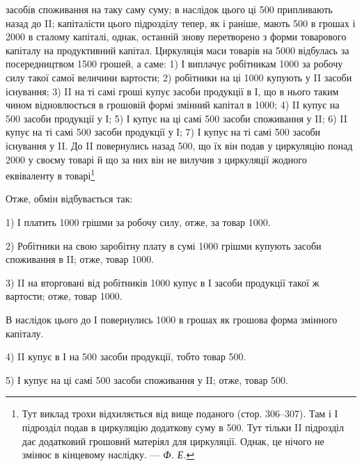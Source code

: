 \parcont{}  %
засобів споживання на таку саму суму; в наслідок цього ці 500
припливають назад до II; капіталісти цього підрозділу тепер, як і раніше,
мають 500 в грошах і 2000 в сталому капіталі,
однак, останній знову перетворено з форми товарового капіталу на продуктивний
капітал. Циркуляція маси товарів на 5000 відбулась
за посередництвом 1500 грошей, а саме: 1) І виплачує робітникам
1000 за робочу силу такої самої величини вартости;
2) робітники на ці 1000 купують у II засоби існування;
3) II на ті самі гроші купує засоби продукції в І, що в нього таким
чином відновлюється в грошовій формі змінний капітал в 1000;
4) II купує на 500 засоби продукції у І;
5) І купує на ці самі 500 засоби споживання у II;
6) II купує на ті самі 500 засоби продукції у І;
7) І купує на ті самі 500 засоби
існування у II. До II повернулись назад 500, що їх він подав у
циркуляцію понад 2000 у своєму товарі й що за них він не
вилучив з циркуляції жодного еквіваленту в товарі\footnote{
Тут виклад трохи відхиляється від вище поданого (стор. 306--307). Там і
І підрозділ подав в циркуляцію додаткову суму в 500. Тут тільки II підрозділ дає
додатковий грошовий матеріял для циркуляції. Однак, це нічого не змінює в
кінцевому наслідку. — \emph{Ф. Е.}}

Отже, обмін відбувається так:

1) І платить 1000 грішми за робочу силу, отже, за товар \deq{} 1000.

2) Робітники на свою заробітну плату в сумі 1000 грішми
купують засоби споживання в II; отже, товар \deq{} 1000.

3) II на вторговані від робітників 1000 купує в І засоби
продукції такої ж вартости; отже, товар \deq{} 1000.

В наслідок цього до І повернулись 1000 в грошах як грошова
форма змінного капіталу.

4) II купує в І на 500 засоби продукції, тобто товар \deq{}
500.

5) І купує на ці самі 500 засоби споживання у II; отже,
товар \deq{} 500.


